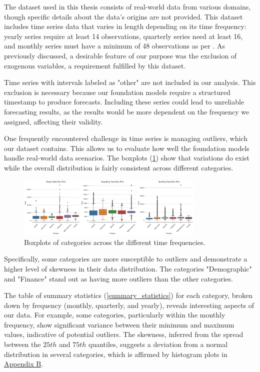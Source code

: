 \documentclass[12pt,a4paper]{article}
\begin{document}
The dataset used in this thesis consists of real-world data from various domains, though specific details about the data's origins are not provided. This dataset includes time series data that varies in length depending on its time frequency: yearly series require at least 14 observations, quarterly series need at least 16, and monthly series must have a minimum of 48 observations as per \cite{MAKRIDAKIS2000}. As previously discussed, a desirable feature of our purpose was the exclusion of exogenous variables, a requirement fulfilled by this dataset. 

Time series with intervals labeled as "other" are not included in our analysis. This exclusion is necessary because our foundation models require a structured timestamp to produce forecasts. Including these series could lead to unreliable forecasting results, as the results would be more dependent on the frequency we assigned, affecting their validity. 

One frequently encountered challenge in time series is managing outliers, which our dataset contains. This allows us to evaluate how well the foundation models handle real-world data scenarios. The boxplots (\ref{boxplot_data_distribution}) show that variations do exist while the overall distribution is fairly consistent across different categories. 

\begin{figure}[htbp]
  \centering
  \includegraphics[width=0.8\textwidth]{real_boxplot_data_descr.png}
  \caption{Boxplots of categories across the different time frequencies.}
  \label{boxplot_data_distribution}
\end{figure}

Specifically, some categories are more susceptible to outliers and demonstrate a higher level of skewness in their data distribution. The categories "Demographic" and "Finance" stand out as having more outliers than the other categories.

The table of summary statistics (\ref{summary_statistics}) for each category, broken down by frequency (monthly, quarterly, and yearly), reveals interesting aspects of our data. For example, some categories, particularly within the monthly frequency, show significant variance between their minimum and maximum values, indicative of potential outliers. The skewness, inferred from the spread between the $25th$ and $75th$ quantiles, suggests a deviation from a normal distribution in several categories, which is affirmed by histogram plots in \hyperref[appendix_b]{Appendix B}. 
\end{document}
